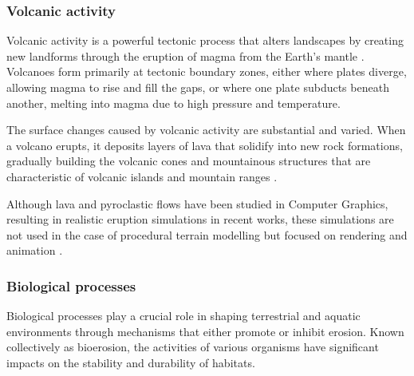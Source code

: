 \subsubsection{Volcanic activity}
Volcanic activity is a powerful tectonic process that alters landscapes by creating new landforms through the eruption of magma from the Earth's mantle \cite{Ramalho2013}. Volcanoes form primarily at tectonic boundary zones, either where plates diverge, allowing magma to rise and fill the gaps, or where one plate subducts beneath another, melting into magma due to high pressure and temperature.

The surface changes caused by volcanic activity are substantial and varied. When a volcano erupts, it deposits layers of lava that solidify into new rock formations, gradually building the volcanic cones and mountainous structures that are characteristic of volcanic islands and mountain ranges \cite{Woodroffe2003}.


Although lava and pyroclastic flows have been studied in Computer Graphics, resulting in realistic eruption simulations in recent works, these simulations are not used in the case of procedural terrain modelling but focused on rendering and animation \cite{Zhang2017,Chang2009,Stora1999,LasticThesis}. 



\subsubsection{Biological processes}
Biological processes play a crucial role in shaping terrestrial and aquatic environments through mechanisms that either promote or inhibit erosion. Known collectively as bioerosion, the activities of various organisms have significant impacts on the stability and durability of habitats.

